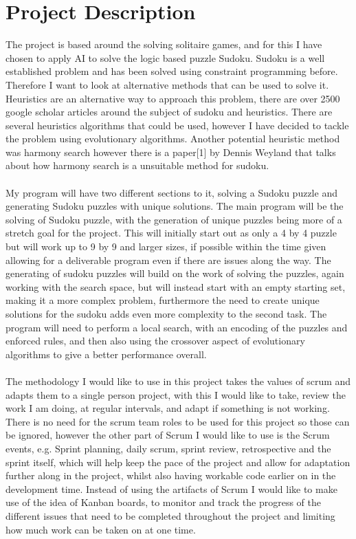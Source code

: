 \documentclass[a4paper,10pt]{article}
\begin{document}
\section*{Project Description}
The project is based around the solving solitaire games, and for this I have chosen to apply AI to solve the logic based puzzle Sudoku. Sudoku is a well established problem and has been solved using constraint programming before. Therefore I want to look at alternative methods that can be used to solve it. Heuristics are an alternative way to approach this problem, there are over 2500 google scholar articles around the subject of sudoku and heuristics. There are several heuristics algorithms that could be used, however I have decided to tackle the problem using evolutionary algorithms. Another potential heuristic method was harmony search however there is a paper[1] by Dennis Weyland that talks about how harmony search is a unsuitable method for sudoku.
\\ \\
My program will have two different sections to it, solving a Sudoku puzzle and generating Sudoku puzzles with unique solutions. The main program will be the solving of Sudoku puzzle, with the generation of unique puzzles being more of a stretch goal for the project. This will initially start out as only a 4 by 4 puzzle but will work up to 9 by 9 and larger sizes, if possible within the time given allowing for a deliverable program even if there are issues along the way. The generating of sudoku puzzles will build on the work of solving the puzzles, again working with the search space, but will instead start with an empty starting set, making it a more complex problem, furthermore the need to create unique solutions for the sudoku adds even more complexity to the second task. The program will need to perform a local search, with an encoding of the puzzles and enforced rules, and then also using the crossover aspect of evolutionary algorithms to give a better performance overall.  
\\ \\
The methodology I would like to use in this project takes the values of scrum and adapts them to a single person project, with this I would like to take, review the work I am doing, at regular intervals, and adapt if something is not working. There is no need for the scrum team roles to be used for this project so those can be ignored, however the other part of Scrum I would like to use is the Scrum events, e.g. Sprint planning, daily scrum, sprint review, retrospective and the sprint itself, which will help keep the pace of the project and allow for adaptation further along in the project, whilst also having workable code earlier on in the development time. Instead of using the artifacts of Scrum I would like to make use of the idea of Kanban boards, to monitor and track the progress of the different issues that need to be completed throughout the project and limiting how much work can be taken on at one time.   
\end{document}
